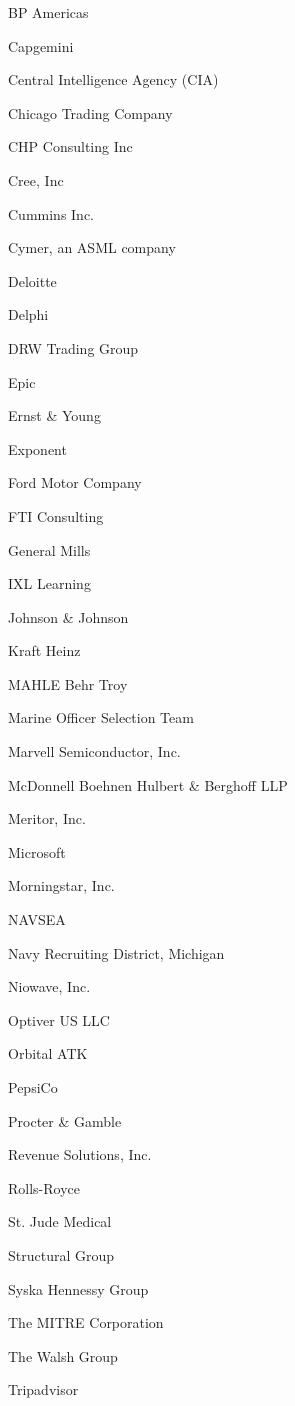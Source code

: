 \documentclass[twoside]{article}
\begin{document}
\begin{center}
\begin{multicols}{5}
\begin{FlushLeft}
\begin{compactitem}
\item BP Americas
\item Capgemini
\item Central Intelligence Agency (CIA)
\item Chicago Trading Company
\item CHP Consulting Inc
\item Cree, Inc
\item Cummins Inc.
\item Cymer, an ASML company
\item Deloitte
\item Delphi
\item DRW Trading Group
\item Epic
\item Ernst \& Young
\item Exponent
\item Ford Motor Company
\item FTI Consulting
\item General Mills
\item IXL Learning
\item Johnson \& Johnson
\item Kraft Heinz
\item MAHLE Behr Troy
\item Marine Officer Selection Team
\item Marvell Semiconductor, Inc.
\item McDonnell Boehnen Hulbert \& Berghoff LLP
\item Meritor, Inc.
\item Microsoft
\item Morningstar, Inc.
\item NAVSEA
\item Navy Recruiting District, Michigan
\item Niowave, Inc.
\item Optiver US LLC
\item Orbital ATK
\item PepsiCo
\item Procter \& Gamble
\item Revenue Solutions, Inc.
\item Rolls-Royce
\item St. Jude Medical
\item Structural Group
\item Syska Hennessy Group
\item The MITRE Corporation
\item The Walsh Group
\item Tripadvisor

\end{compactitem}
\end{FlushLeft}
\end{multicols}
\end{center}
\end{document}
